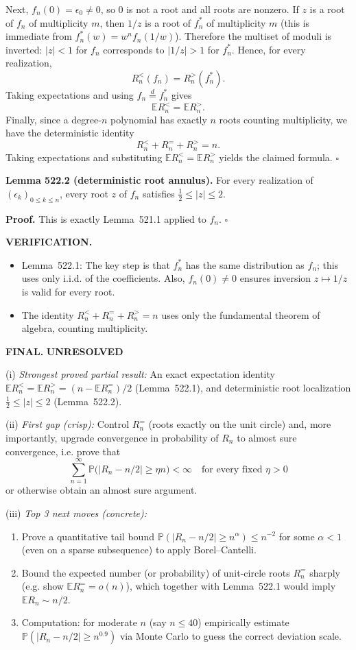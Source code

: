Next, $f_n(0)=\epsilon_0\ne 0$, so $0$ is not a root and all roots are nonzero.
If $z$ is a root of $f_n$ of multiplicity $m$, then $1/z$ is a root of $f_n^*$ of multiplicity $m$ (this is immediate from $f_n^*(w)=w^n f_n(1/w)$).
Therefore the multiset of moduli is inverted: $|z|<1$ for $f_n$ corresponds to $|1/z|>1$ for $f_n^*$. Hence, for every realization,
\[R_n^{<}(f_n)=R_n^{>}(f_n^*).
\]
Taking expectations and using $f_n\stackrel{d}{=} f_n^*$ gives
\[\mathbb E R_n^{<} = \mathbb E R_n^{>}.
\]
Finally, since a degree-$n$ polynomial has exactly $n$ roots counting multiplicity, we have the deterministic identity
\[R_n^{<}+R_n^{=}+R_n^{>}=n.
\]
Taking expectations and substituting $\mathbb E R_n^{<}=\mathbb E R_n^{>}$ yields the claimed formula.
\hfill$\square$

\medskip
\noindent\textbf{Lemma 522.2 (deterministic root annulus).}
For every realization of $(\epsilon_k)_{0\le k\le n}$, every root $z$ of $f_n$ satisfies $\tfrac12\le |z|\le 2$.

\noindent\textbf{Proof.}
This is exactly Lemma~521.1 applied to $f_n$.
\hfill$\square$

\bigskip
\noindent\textbf{VERIFICATION.}
\begin{itemize}
\item Lemma~522.1: The key step is that $f_n^*$ has the same distribution as $f_n$; this uses only i.i.d. of the coefficients. Also, $f_n(0)\ne 0$ ensures inversion $z\mapsto 1/z$ is valid for every root.
\item The identity $R_n^{<}+R_n^{=}+R_n^{>}=n$ uses only the fundamental theorem of algebra, counting multiplicity.
\end{itemize}

\bigskip
\noindent\textbf{FINAL.} \textbf{UNRESOLVED}

(i) \emph{Strongest proved partial result:}
An exact expectation identity $\mathbb E R_n^{<}=\mathbb E R_n^{>}=(n-\mathbb E R_n^{=})/2$ (Lemma~522.1), and deterministic root localization $\tfrac12\le |z|\le 2$ (Lemma~522.2).

(ii) \emph{First gap (crisp):}
Control $R_n^{=}$ (roots exactly on the unit circle) and, more importantly, upgrade convergence in probability of $R_n$ to almost sure convergence, i.e. prove that
\[\sum_{n=1}^\infty \mathbb P\big(|R_n-n/2|\ge \eta n\big)<\infty\quad\text{for every fixed }\eta>0
\]
or otherwise obtain an almost sure argument.

(iii) \emph{Top 3 next moves (concrete):}
\begin{enumerate}
\item Prove a quantitative tail bound $\mathbb P(|R_n-n/2|\ge n^{\alpha})\le n^{-2}$ for some $\alpha<1$ (even on a sparse subsequence) to apply Borel--Cantelli.
\item Bound the expected number (or probability) of unit-circle roots $R_n^{=}$ sharply (e.g. show $\mathbb E R_n^{=} = o(n)$), which together with Lemma~522.1 would imply $\mathbb E R_n\sim n/2$.
\item Computation: for moderate $n$ (say $n\le 40$) empirically estimate $\mathbb P(|R_n-n/2|\ge n^{0.9})$ via Monte Carlo to guess the correct deviation scale.
\end{enumerate}


